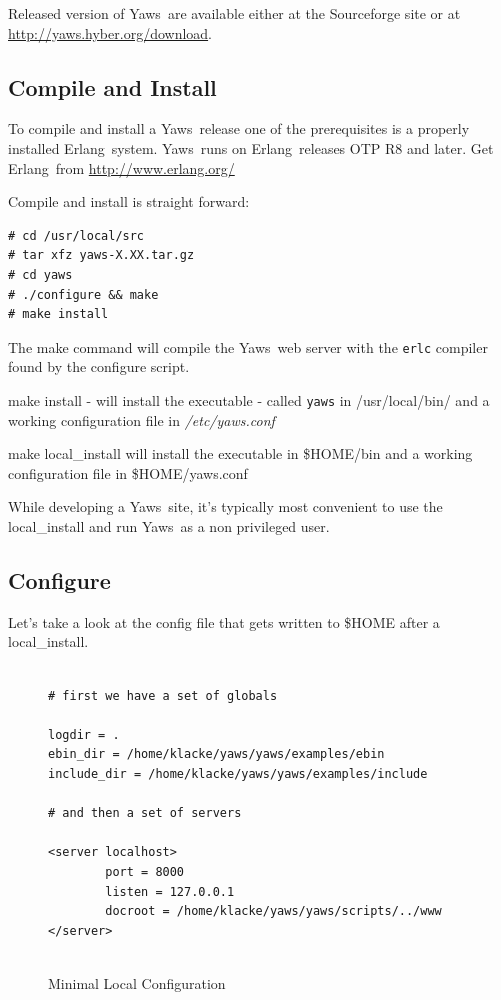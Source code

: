 \documentclass[11pt,oneside,english]{book}
\newcommand{\Erlang}            %
        {{\sc Erlang}}
\newcommand{\Yaws}            %
        {{\sc Yaws}}
\begin{document}
Released version of \Yaws\  are available either at the Sourceforge site or
at \url{http://yaws.hyber.org/download}.



\subsection{Compile and Install}

To compile and install a \Yaws\  release
one of the prerequisites is a properly installed \Erlang\  system. \Yaws\
runs on \Erlang\  releases OTP R8 and later. Get \Erlang\  from
\url{http://www.erlang.org/}

Compile and install is straight forward:
\begin{verbatim}
# cd /usr/local/src
# tar xfz yaws-X.XX.tar.gz
# cd yaws
# ./configure && make
# make install
\end{verbatim}

The make command will compile the \Yaws\  web server with the \verb+erlc+
compiler found by the configure script.

make install - will install the executable - called \verb+yaws+ in
/usr/local/bin/ and a working configuration file in \textit{ /etc/yaws.conf}

make local\_install will install the executable in \$HOME/bin and a
working configuration file in \$HOME/yaws.conf

While developing a \Yaws\  site, it's typically most convenient to
use the local\_install and run \Yaws\  as a non privileged user.


\subsection{Configure}
Let's take a look at the config file that gets written to \$HOME after
a local\_install.


\begin{figure}[h]
\begin{verbatim}

# first we have a set of globals

logdir = .
ebin_dir = /home/klacke/yaws/yaws/examples/ebin
include_dir = /home/klacke/yaws/yaws/examples/include

# and then a set of servers

<server localhost>
        port = 8000
        listen = 127.0.0.1
        docroot = /home/klacke/yaws/yaws/scripts/../www
</server>


\end{verbatim}
\caption{Minimal Local Configuration}
\end{figure}
\end{document}
